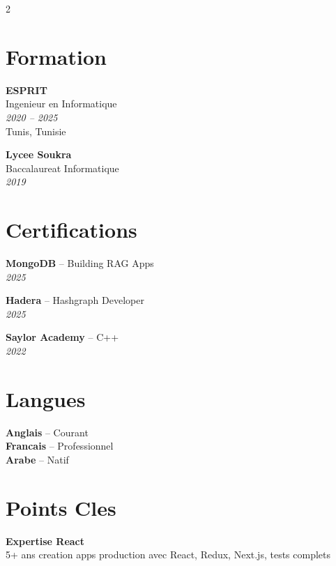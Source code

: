 \documentclass[10pt,a4paper]{article}
\begin{document}
\vspace{5pt}
\begin{multicols}{2}

\section*{Formation}
\vspace{2pt}
{\small
\textbf{ESPRIT}\\[1pt]
Ingenieur en Informatique\\[1pt]
\textit{2020 -- 2025}\\[1pt]
Tunis, Tunisie

\vspace{4pt}
\textbf{Lycee Soukra}\\[1pt]
Baccalaureat Informatique\\[1pt]
\textit{2019}
}

\vspace{4pt}
\section*{Certifications}
\vspace{2pt}
{\small
\textbf{MongoDB} -- Building RAG Apps\\[1pt]
\textit{2025}

\vspace{2pt}
\textbf{Hadera} -- Hashgraph Developer\\[1pt]
\textit{2025}

\vspace{2pt}
\textbf{Saylor Academy} -- C++\\[1pt]
\textit{2022}
}

\columnbreak

\section*{Langues}
\vspace{2pt}
{\small
\textbf{Anglais} -- Courant\\[2pt]
\textbf{Francais} -- Professionnel\\[2pt]
\textbf{Arabe} -- Natif
}

\vspace{4pt}
\section*{Points Cles}
\vspace{2pt}
{\small
\textbf{Expertise React}\\[1pt]
5+ ans creation apps production avec React, Redux, Next.js, tests complets

}
\end{multicols}
\end{document}
